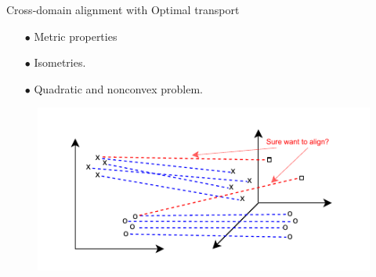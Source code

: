 \documentclass{beamer}
\begin{document}
\begin{frame}{Cross-domain alignment with Optimal transport}
\vspace{-0.3cm}
\begin{minipage}[t]{0.5\linewidth}
\begin{itemize}
  \item[$\bullet$] Metric properties
  \item[$\bullet$] Isometries.
  \item[$\bullet$] Quadratic and nonconvex problem.
\end{itemize}
\end{minipage}%
\hfill%
\hspace{-6cm}
\begin{minipage}[t]{0.55\linewidth}
\begin{figure}
  \centering
  \includegraphics[width=1.2\linewidth, keepaspectratio=true]{OT_new/ugw_transition.pdf}
\end{figure}
\end{minipage}

\end{frame}
\end{document}
